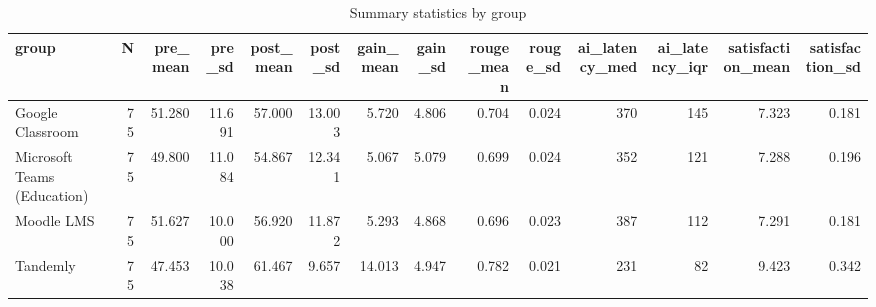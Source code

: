 \begin{table}
\caption{Summary statistics by group}
\label{tab:summary}
\begin{tabular}{lrrrrrrrrrrrrr}
\toprule
group & N & pre_mean & pre_sd & post_mean & post_sd & gain_mean & gain_sd & rouge_mean & rouge_sd & ai_latency_med & ai_latency_iqr & satisfaction_mean & satisfaction_sd \\
\midrule
Google Classroom & 75 & 51.280 & 11.691 & 57.000 & 13.003 & 5.720 & 4.806 & 0.704 & 0.024 & 370 & 145 & 7.323 & 0.181 \\
Microsoft Teams (Education) & 75 & 49.800 & 11.084 & 54.867 & 12.341 & 5.067 & 5.079 & 0.699 & 0.024 & 352 & 121 & 7.288 & 0.196 \\
Moodle LMS & 75 & 51.627 & 10.000 & 56.920 & 11.872 & 5.293 & 4.868 & 0.696 & 0.023 & 387 & 112 & 7.291 & 0.181 \\
Tandemly & 75 & 47.453 & 10.038 & 61.467 & 9.657 & 14.013 & 4.947 & 0.782 & 0.021 & 231 & 82 & 9.423 & 0.342 \\
\bottomrule
\end{tabular}
\end{table}
